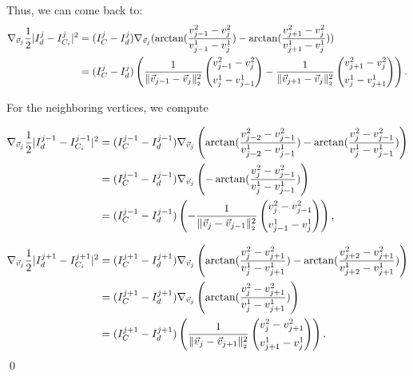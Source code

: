 \begin{proposition}
	Thus, we can come back to: 
	\begin{align*}
		\nabla_{\vec{v}_j} \frac{1}{2}| I^{j}_d - I^{j}_{C_i} |^2 
		&= (I^j_{C} - I^{j}_d) \nabla_{\vec{v}_j} (\arctan(\frac{v_{j-1}^2 - v_{j}^2}{v_{j-1}^1 - v_{j}^1}) - \arctan(\frac{v_{j+1}^2 - v_{j}^2}{v_{j+1}^1 - v_{j}^1})) \\
		&= (I^j_{C} - I^{j}_d) \left( 
		  \frac{1}{\norm[\vec{v}_{j-1} - \vec{v}_j]^2} \begin{pmatrix}
			v_{j-1}^2 - v_{j}^2 \\[0.5em]
			v_{j}^1 - v_{j-1}^1
		\end{pmatrix} 
		- \frac{1}{\norm[\vec{v}_{j+1} - \vec{v}_j]^2} \begin{pmatrix}
			v_{j+1}^2 - v_{j}^2 \\[0.5em]
			v_{j}^1 - v_{j+1}^1
		\end{pmatrix} \right).
	\end{align*}

	For the neighboring vertices, we compute 

	\begin{align*}
		\nabla_{\vec{v}_j} \frac{1}{2}| I^{j-1}_d - I^{j-1}_{C_i} |^2 
		&= (I^{j-1}_{C} - I^{j-1}_d) \nabla_{\vec{v}_j} \left(\arctan(\frac{v_{j-2}^2 - v_{j-1}^2}{v_{j-2}^1 - v_{j-1}^1}) - \arctan(\frac{v_{j}^2 - v_{j-1}^2}{v_{j}^1 - v_{j-1}^1})\right) \\
		&= (I^{j-1}_{C} - I^{j-1}_d) \nabla_{\vec{v}_j} \left(- \arctan(\frac{v_{j}^2 - v_{j-1}^2}{v_{j}^1 - v_{j-1}^1})\right) \\
		&= (I^{j-1}_{C} - I^{j-1}_d) \left( 
		 - \frac{1}{\norm[\vec{v}_{j} - \vec{v}_{j-1}]^2} \begin{pmatrix}
			v_{j}^2 - v_{j-1}^2 \\[0.5em]
			v_{j-1}^1 - v_{j}^1
		\end{pmatrix} \right),
	\end{align*}

	\begin{align*}
		\nabla_{\vec{v}_j} \frac{1}{2}| I^{j+1}_d - I^{j+1}_{C_i} |^2 
		&= (I^{j+1}_{C} - I^{j+1}_d) \nabla_{\vec{v}_j} \left(\arctan(\frac{v_{j}^2 - v_{j+1}^2}{v_{j}^1 - v_{j+1}^1}) - \arctan(\frac{v_{j+2}^2 - v_{j+1}^2}{v_{j+2}^1 - v_{j+1}^1})\right) \\
		&= (I^{j+1}_{C} - I^{j+1}_d) \nabla_{\vec{v}_j} \left( \arctan(\frac{v_{j}^2 - v_{j+1}^2}{v_{j}^1 - v_{j+1}^1}) \right) \\
		&= (I^{j+1}_{C} - I^{j+1}_d) \left( 
		 \frac{1}{\norm[\vec{v}_{j} - \vec{v}_{j+1}]^2} \begin{pmatrix}
			v_{j}^2 - v_{j+1}^2 \\[0.5em]
			v_{j+1}^1 - v_{j}^1
		\end{pmatrix} \right).
	\end{align*}
	\qed
\end{proposition}

